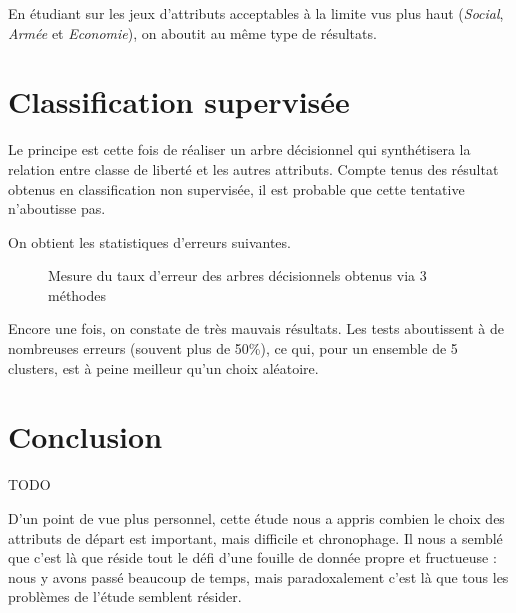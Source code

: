 En étudiant sur les jeux d'attributs \og acceptables à la limite \fg vus plus haut (\emph{Social}, \emph{Armée} et \emph{Economie}), on aboutit au même type de résultats.

\section{Classification supervisée}
Le principe est cette fois de réaliser un arbre décisionnel qui synthétisera la relation entre classe de liberté et les autres attributs. Compte tenus des résultat obtenus en classification non supervisée, il est probable que cette tentative n'aboutisse pas.


On obtient les statistiques d'erreurs suivantes.
\begin{figure}[H]
	\centering
	\caption{Mesure du taux d'erreur des arbres décisionnels obtenus via 3 méthodes}
\end{figure}

Encore une fois, on constate de très mauvais résultats. Les tests aboutissent à de nombreuses erreurs (souvent plus de 50\%), ce qui, pour un ensemble de 5 clusters, est à peine meilleur qu'un choix aléatoire.


\section{Conclusion}

{\huge TODO}

D'un point de vue plus personnel, cette étude nous a appris combien le choix des attributs de départ est important, mais difficile et chronophage. Il nous a semblé que c'est là que réside tout le défi d'une fouille de donnée propre et fructueuse : nous y avons passé beaucoup de temps, mais paradoxalement c'est là que tous les problèmes de l'étude semblent résider.

